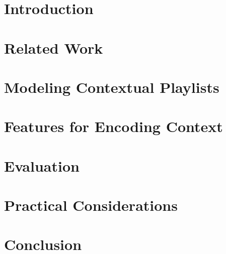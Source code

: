\documentclass{sig-alternate}
\begin{document}
\begin{abstract}
	
\end{abstract}
\section{Introduction}
\label{sec:Introduction}
   
\section{Related Work}
\label{sec:Related}
    
\section{Modeling Contextual Playlists}
\label{sec:ourapproach}
    
\section{Features for Encoding Context}
\label{sec:Features}
	
\section{Evaluation}
\label{sec:experiments}
    
 \section{Practical Considerations}
 \label{sec:practicalConsiderations}
 
%    
\section{Conclusion}
    
\label{sec:conclusion}



\end{document}
